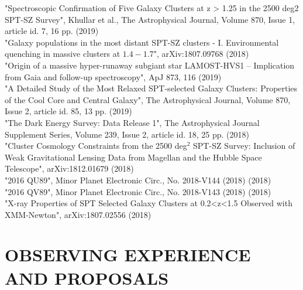 \documentclass[margin]{res}
\begin{document}
\begin{resume}
"Spectroscopic Confirmation of Five Galaxy Clusters at z > 1.25 in the 2500 deg2 SPT-SZ Survey", Khullar et al., The Astrophysical Journal, Volume 870, Issue 1, article id. 7, 16 pp. (2019)\\
"Galaxy populations in the most distant SPT-SZ clusters - I. Environmental quenching in massive clusters at $1.4-1.7$", arXiv:1807.09768 (2018)\\
"Origin of a massive hyper-runaway subgiant star LAMOST-HVS1 -- Implication from Gaia and follow-up spectroscopy", ApJ 873, 116 (2019)\\
"A Detailed Study of the Most Relaxed SPT-selected Galaxy Clusters: Properties of the Cool Core and Central Galaxy", The Astrophysical Journal, Volume 870, Issue 2, article id. 85, 13 pp. (2019)\\
"The Dark Energy Survey: Data Release 1", The Astrophysical Journal Supplement Series, Volume 239, Issue 2, article id. 18, 25 pp. (2018)\\
"Cluster Cosmology Constraints from the 2500 deg$^2$ SPT-SZ Survey: Inclusion of Weak Gravitational Lensing Data from Magellan and the Hubble Space Telescope", arXiv:1812.01679 (2018)\\
"2016 QU89", Minor Planet Electronic Circ., No. 2018-V144 (2018) (2018)\\
"2016 QV89", Minor Planet Electronic Circ., No. 2018-V143 (2018) (2018)\\
"X-ray Properties of SPT Selected Galaxy Clusters at 0.2<z<1.5 Observed with XMM-Newton", arXiv:1807.02556 (2018)\\

\section{OBSERVING EXPERIENCE AND PROPOSALS}


\end{resume}
\end{document}
